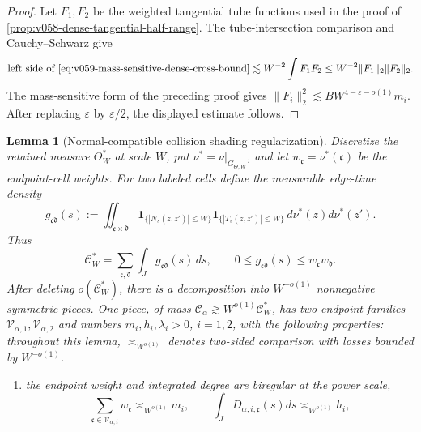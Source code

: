 \documentclass[10pt]{article}
\newtheorem{lemma}[theorem]{Lemma}
\begin{document}
\begin{proof}
Let \(F_1,F_2\) be the weighted tangential tube functions used in the proof of
\cref{prop:v058-dense-tangential-half-range}.  The tube-intersection comparison and
Cauchy--Schwarz give
\[
\text{left side of \eqref{eq:v059-mass-sensitive-dense-cross-bound}}
\lesssim
W^{-2}\int F_1F_2
\le
W^{-2}\|F_1\|_2\|F_2\|_2.
\]
The mass-sensitive form of the preceding proof gives
\(\|F_i\|_2^2\lesssim BW^{4-\varepsilon-o(1)}m_i\).  After replacing
\(\varepsilon\) by \(\varepsilon/2\), the displayed estimate follows.
\end{proof}

\begin{lemma}[Normal-compatible collision shading regularization]
\label{lem:v060-normal-compatible-shading-regularization}
Discretize the retained measure \(\Theta_W^*\) at scale \(W\), put
\(\nu^*=\nu|_{G_{\Theta,W}}\), and let
\(w_{\mathfrak c}=\nu^*(\mathfrak c)\) be the endpoint-cell weights.  For two labeled cells define
the measurable edge-time density
\begin{equation}
\label{eq:v060-cell-edge-time-density}
g_{\mathfrak c\mathfrak d}(s)
:=
\iint_{\mathfrak c\times\mathfrak d}
\mathbf 1_{\{|N_s(z,z')|\le W\}}
\mathbf 1_{\{|T_s(z,z')|\le W\}}
\,d\nu^*(z)d\nu^*(z').
\end{equation}
Thus
\begin{equation}
\label{eq:v060-cell-edge-time-sum}
\boxed{
\mathcal C_W^*
=
\sum_{\mathfrak c,\mathfrak d}\int_J
g_{\mathfrak c\mathfrak d}(s)\,ds,
\qquad
0\le g_{\mathfrak c\mathfrak d}(s)
\le w_{\mathfrak c}w_{\mathfrak d}.
}
\end{equation}
After deleting \(o(\mathcal C_W^*)\), there is a decomposition into
\(W^{-o(1)}\) nonnegative symmetric pieces.  One piece, of mass
\(\mathcal C_\alpha\gtrsim W^{o(1)}\mathcal C_W^*\), has two endpoint families
\(\mathscr V_{\alpha,1},\mathscr V_{\alpha,2}\) and numbers
\(m_i,h_i,\lambda_i>0\), \(i=1,2\), with the following properties:
throughout this lemma, \(\asymp_{W^{o(1)}}\) denotes two-sided comparison with losses bounded by
\(W^{-o(1)}\).
\begin{enumerate}[label=\textnormal{(\roman*)}]
\item the endpoint weight and integrated degree are biregular at the power scale,
\begin{equation}
\label{eq:v060-biregular-mass-degree}
\boxed{
\sum_{\mathfrak c\in\mathscr V_{\alpha,i}}w_{\mathfrak c}
\asymp_{W^{o(1)}}m_i,
\qquad
\int_JD_{\alpha,i,\mathfrak c}(s)ds
\asymp_{W^{o(1)}}h_i,
}
\end{equation}
\end{enumerate}
\end{lemma}
\end{document}
